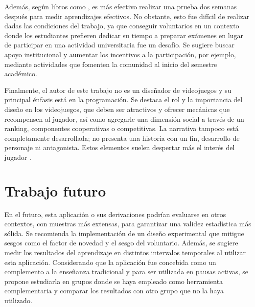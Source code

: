 Además, según libros como \cite{Rogers2002InteractionDB}, es más efectivo realizar una prueba dos semanas después para medir aprendizajes efectivos. No obstante, esto fue difícil de realizar dadas las condiciones del trabajo, ya que conseguir voluntarios en un contexto donde los estudiantes prefieren dedicar su tiempo a preparar exámenes en lugar de participar en una actividad universitaria fue un desafío. Se sugiere buscar apoyo institucional y aumentar los incentivos a la participación, por ejemplo, mediante actividades que fomenten la comunidad al inicio del semestre académico.

Finalmente, el autor de este trabajo no es un diseñador de videojuegos y su principal énfasis está en la programación. Se destaca el rol y la importancia del diseño en los videojuegos, que deben ser atractivos y ofrecer mecánicas que recompensen al jugador, así como agregarle una dimensión social a través de un ranking, componentes cooperativas o competitivas. La narrativa tampoco está completamente desarrollada; no presenta una historia con un fin, desarrollo de personaje ni antagonista. Estos elementos suelen despertar más el interés del jugador \cite{Zea2014ModelingST, FrangoSilveira2019BuildingEN}.


\section{Trabajo futuro}



En el futuro, esta aplicación o sus derivaciones podrían evaluarse en otros contextos, con muestras más extensas, para garantizar una validez estadística más sólida. Se recomienda la implementación de un diseño experimental que mitigue sesgos como el factor de novedad y el sesgo del voluntario. Además, se sugiere medir los resultados del aprendizaje en distintos intervalos temporales al utilizar esta aplicación. Considerando que la aplicación fue concebida como un complemento a la enseñanza tradicional y para ser utilizada en pausas activas, se propone estudiarla en grupos donde se haya empleado como herramienta complementaria y comparar los resultados con otro grupo que no la haya utilizado.

